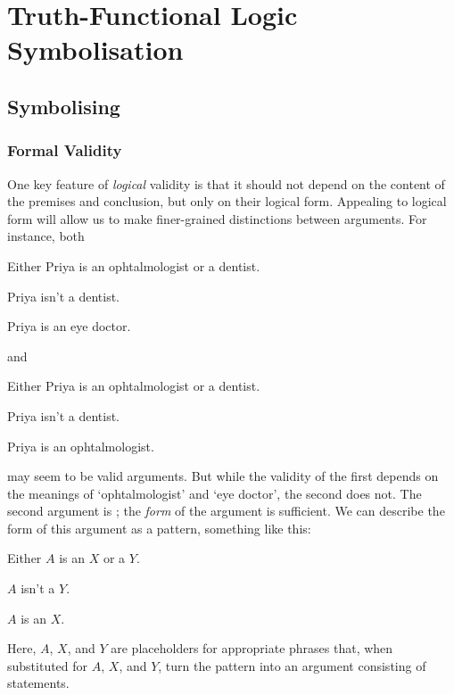 \documentclass[PHIL101-Textbook.tex]{subfiles}
\begin{document}
\part[Truth-Functional Logic]{Truth-Functional Logic\\Symbolisation} \label{part:tfl}

\chapter{Symbolising}\label{ch:Symbolising}

\section{Formal Validity}\label{s:FormalValidity}

One key feature of \emph{logical} validity is that it should not depend on the content of the premises and conclusion, but only on their logical form. Appealing to logical form will allow us to make finer-grained distinctions between arguments. For instance, both
\begin{earg}
	\item[] Either Priya is an ophtalmologist or a dentist.
	\item[] Priya isn't a dentist.
	\item[\therefore] Priya is an eye doctor.
\end{earg}
and
\begin{earg}
	\item[] Either Priya is an ophtalmologist or a dentist.
	\item[] Priya isn't a dentist.
	\item[\therefore] Priya is an ophtalmologist.
\end{earg}
may seem to be valid arguments. But while the validity of the first depends on the meanings of `ophtalmologist' and `eye doctor', the second does not. The second argument is ; the \emph{form} of the argument is sufficient. We can describe the form of this argument as a pattern, something like this:
\begin{earg}
	\item[] Either $A$ is an $X$ or a $Y$.
	\item[] $A$ isn't a $Y$.
	\item[\therefore] $A$ is an $X$.
\end{earg}
Here, $A$, $X$, and $Y$ are placeholders for appropriate phrases that, when substituted for $A$, $X$, and $Y$, turn the pattern into an argument consisting of statements. 
\end{document}
